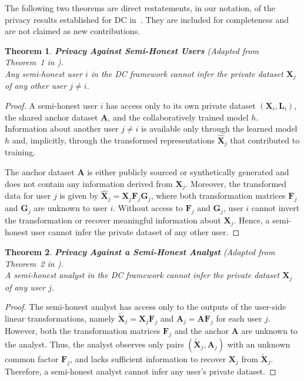 \documentclass[final,3p,times]{elsarticle}
\theoremstyle{plain}
\newtheorem{theorem}{Theorem}[section]
\newcommand{\matr}[1]{\bm{#1}}        %
\begin{document}
The following two theorems are direct restatements, in our notation, of the privacy results established for DC in~\cite{DCprivacy}. They are included for completeness and are not claimed as new contributions.

\begin{theorem}
\label{theorem: privacy-semi-honest-users}
\textbf{Privacy Against Semi-Honest Users} \emph{(Adapted from Theorem~1 in \cite{DCprivacy})}.\\
Any semi-honest user \( i \) in the DC framework cannot infer the private dataset \( \matr{X}_j \) of any other user \( j \neq i \).
\end{theorem}

\begin{proof}
A semi-honest user \(i\) has access only to its own private dataset \((\matr{X}_i,\matr{L}_i)\), the shared anchor dataset \(\matr{A}\), and the collaboratively trained model \(h\). Information about another user \(j \neq i\) is available only through the learned model \(h\) and, implicitly, through the transformed representations \(\hat{\matr{X}}_j\) that contributed to training.

The anchor dataset \(\matr{A}\) is either publicly sourced or synthetically generated and does not contain any information derived from \(\matr{X}_j\). Moreover, the transformed data for user \(j\) is given by \(\hat{\matr{X}}_j = \matr{X}_j \matr{F}_j \matr{G}_j\), where both transformation matrices \(\matr{F}_j\) and \(\matr{G}_j\) are unknown to user \(i\). Without access to \(\matr{F}_j\) and \(\matr{G}_j\), user \(i\) cannot invert the transformation or recover meaningful information about \(\matr{X}_j\). Hence, a semi-honest user cannot infer the private dataset of any other user.
\end{proof}

\begin{theorem}
\label{theorem: privacy-semi-honest-analyst}
\textbf{Privacy Against a Semi-Honest Analyst} \emph{(Adapted from Theorem~2 in \cite{DCprivacy})}.\\
A semi-honest analyst in the DC framework cannot infer the private dataset \( \matr{X}_j \) of any user \( j \).
\end{theorem}

\begin{proof}
The semi-honest analyst has access only to the outputs of the user-side linear transformations, namely
\(\tilde{\matr{X}}_j = \matr{X}_j \matr{F}_j\) and
\(\matr{A}_j = \matr{A} \matr{F}_j\) for each user \(j\). However, both the transformation matrices \(\matr{F}_j\) and the anchor \(\matr{A}\) are unknown to the analyst. Thus, the analyst observes only pairs \((\tilde{\matr{X}}_j,\matr{A}_j)\) with an unknown common factor \(\matr{F}_j\), and lacks sufficient information to recover \(\matr{X}_j\) from \(\tilde{\matr{X}}_j\). Therefore, a semi-honest analyst cannot infer any user’s private dataset.
\end{proof}
\end{document}
